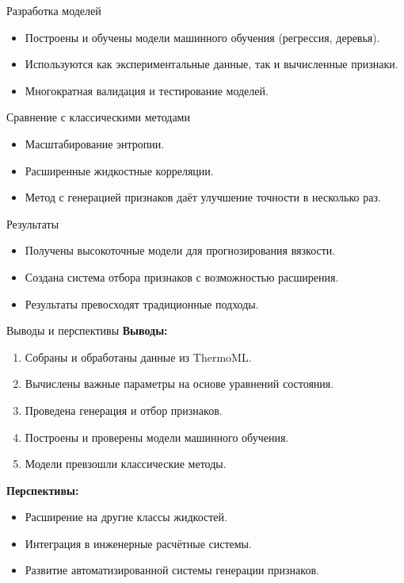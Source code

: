 \documentclass[aspectratio=169]{beamer}
\begin{document}
\begin{frame}{Разработка моделей}
    \begin{itemize}
        \item Построены и обучены модели машинного обучения (регрессия, деревья).
        \item Используются как экспериментальные данные, так и вычисленные признаки.
        \item Многократная валидация и тестирование моделей.
    \end{itemize}
\end{frame}

\begin{frame}{Сравнение с классическими методами}
    \begin{itemize}
        \item Масштабирование энтропии.
        \item Расширенные жидкостные корреляции.
        \item Метод с генерацией признаков даёт улучшение точности в несколько раз.
    \end{itemize}
\end{frame}

\begin{frame}{Результаты}
    \begin{itemize}
        \item Получены высокоточные модели для прогнозирования вязкости.
        \item Создана система отбора признаков с возможностью расширения.
        \item Результаты превосходят традиционные подходы.
    \end{itemize}
\end{frame}

\begin{frame}{Выводы и перспективы}
    \textbf{Выводы:}
    \begin{enumerate}
        \item Собраны и обработаны данные из ThermoML.
        \item Вычислены важные параметры на основе уравнений состояния.
        \item Проведена генерация и отбор признаков.
        \item Построены и проверены модели машинного обучения.
        \item Модели превзошли классические методы.
    \end{enumerate}
    \textbf{Перспективы:}
    \begin{itemize}
        \item Расширение на другие классы жидкостей.
        \item Интеграция в инженерные расчётные системы.
        \item Развитие автоматизированной системы генерации признаков.
    \end{itemize}
\end{frame}
\end{document}
